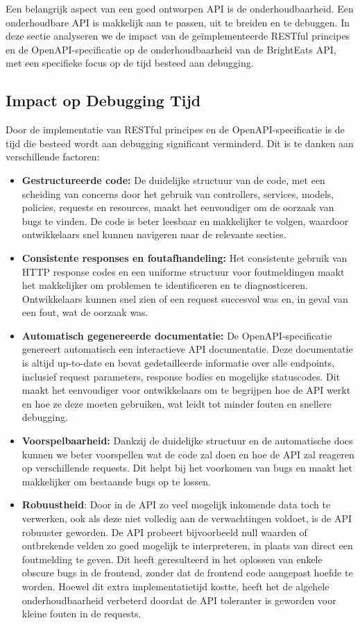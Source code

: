 Een belangrijk aspect van een goed ontworpen API is de onderhoudbaarheid. Een onderhoudbare API is makkelijk aan te passen, uit te breiden en te debuggen. In deze sectie analyseren we de impact van de geïmplementeerde RESTful principes en de OpenAPI-specificatie op de onderhoudbaarheid van de Bright\-Eats API, met een specifieke focus op de tijd besteed aan debugging.

\subsection{Impact op Debugging Tijd}

Door de implementatie van RESTful principes en de OpenAPI-specificatie is de tijd die besteed wordt aan debugging significant verminderd. Dit is te danken aan verschillende factoren:

\begin{itemize}
\item \textbf{Gestructureerde code:} De duidelijke structuur van de code, met een scheiding van concerns door het gebruik van controllers, services, models, policies, requests en resources, maakt het eenvoudiger om de oorzaak van bugs te vinden. De code is beter leesbaar en makkelijker te volgen, waardoor ontwikkelaars snel kunnen navigeren naar de relevante secties.
\item \textbf{Consistente responses en foutafhandeling:} Het consistente gebruik van HTTP response codes en een uniforme structuur voor foutmeldingen maakt het makkelijker om problemen te identificeren en te diagnosticeren. Ontwikkelaars kunnen snel zien of een request succesvol was en, in geval van een fout, wat de oorzaak was.
\item \textbf{Automatisch gegenereerde documentatie:} De OpenAPI-specificatie genereert automatisch een interactieve API documentatie. Deze documentatie is altijd up-to-date en bevat gedetailleerde informatie over alle endpoints, inclusief request parameters, response bodies en mogelijke statuscodes. Dit maakt het eenvoudiger voor ontwikkelaars om te begrijpen hoe de API werkt en hoe ze deze moeten gebruiken, wat leidt tot minder fouten en snellere debugging.
\item \textbf{Voorspelbaarheid:} Dankzij de duidelijke structuur en de automatische docs kunnen we beter voorspellen wat de code zal doen en hoe de API zal reageren op verschillende requests. Dit helpt bij het voorkomen van bugs en maakt het makkelijker om bestaande bugs op te lossen.
\item \textbf{Robuustheid}: Door in de API zo veel mogelijk inkomende data toch te verwerken, ook als deze niet volledig aan de verwachtingen voldoet, is de API robuuster geworden. De API probeert bijvoorbeeld null waarden of ontbrekende velden zo goed mogelijk te interpreteren, in plaats van direct een foutmelding te geven. Dit heeft geresulteerd in het oplossen van enkele obscure bugs in de frontend, zonder dat de frontend code aangepast hoefde te worden. Hoewel dit extra implementatietijd kostte, heeft het de algehele onderhoudbaarheid verbeterd doordat de API toleranter is geworden voor kleine fouten in de requests.
\end{itemize}

